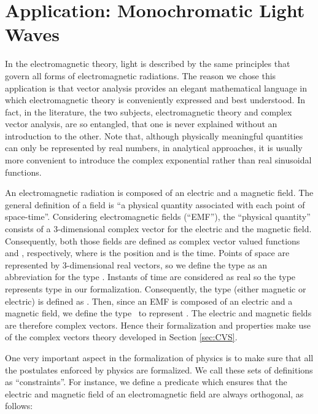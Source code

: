 \documentclass{llncs}
\begin{document}
{  \section{Application: Monochromatic Light Waves}
  \label{sec:application}
In the electromagnetic theory, light is described by the same principles that govern all forms of electromagnetic radiations.
The reason we chose this application is that vector analysis provides an elegant mathematical language in which electromagnetic theory is conveniently expressed and best understood. 
In fact, in the literature, the two subjects, electromagnetic theory and complex vector analysis, are so entangled, that one is never explained without an introduction to the other. Note that, although physically meaningful quantities can only be represented by real numbers, in analytical approaches, it is usually more convenient to introduce the complex exponential rather than real sinusoidal functions. 

An electromagnetic radiation is composed of an electric and a magnetic field. 
The general definition of a field is ``a physical quantity associated with each point of space-time''.
Considering electromagnetic fields (``EMF''), the ``physical quantity'' consists of a 3-dimensional complex vector for the electric and the magnetic field.
Consequently, both those fields are defined as complex vector valued functions  and , respectively, where  is the position and  is the time.
Points of space are represented by 3-dimensional real vectors, so we define the type  as an abbreviation for the type . Instants of time are considered as real so the type  represents type  in our formalization.
Consequently, the type  (either magnetic or electric) is defined as .
	Then, since an EMF is composed of an electric and a magnetic field, we define the type \hol \emf\ to represent .
	The electric and magnetic fields are therefore complex vectors.
	Hence their formalization and properties make use of the complex vectors theory developed in Section \ref{sec:CVS}.

One very important aspect in the formalization of physics is to make sure that all the postulates enforced by physics are formalized. We call these sets of definitions as ``constraints''. For instance, we define a predicate which ensures that the electric and magnetic field of an electromagnetic field are always orthogonal, as follows: 

}
\end{document}

